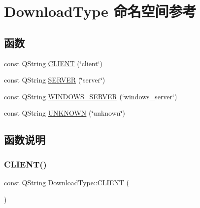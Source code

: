 \hypertarget{namespace_download_type}{}\section{Download\+Type 命名空间参考}
\label{namespace_download_type}
\subsection*{函数}
\begin{DoxyCompactItemize}
\item 
const Q\+String \mbox{\hyperlink{namespace_download_type_afe154da78c9cd3feefdb3acbd92c2db8}{C\+L\+I\+E\+NT}} (\char`\"{}client\char`\"{})
\item 
const Q\+String \mbox{\hyperlink{namespace_download_type_a60f14109adbb0d7eef93873a63e7a0f1}{S\+E\+R\+V\+ER}} (\char`\"{}server\char`\"{})
\item 
const Q\+String \mbox{\hyperlink{namespace_download_type_ae5f0852515c83e221c3668568b550472}{W\+I\+N\+D\+O\+W\+S\+\_\+\+S\+E\+R\+V\+ER}} (\char`\"{}windows\+\_\+server\char`\"{})
\item 
const Q\+String \mbox{\hyperlink{namespace_download_type_af0b7e3166d9097f4d852921ee9d451c3}{U\+N\+K\+N\+O\+WN}} (\char`\"{}unknown\char`\"{})
\end{DoxyCompactItemize}


\subsection{函数说明}
\mbox{\label{namespace_download_type_afe154da78c9cd3feefdb3acbd92c2db8}} 
\subsubsection{\texorpdfstring{C\+L\+I\+E\+N\+T()}{CLIENT()}}
{\footnotesize\ttfamily const Q\+String Download\+Type\+::\+C\+L\+I\+E\+NT (\begin{DoxyParamCaption}\item[{\char`\"{}client\char`\"{}}]{ }\end{DoxyParamCaption})}

\mbox{\label{namespace_download_type_a60f14109adbb0d7eef93873a63e7a0f1}} 
